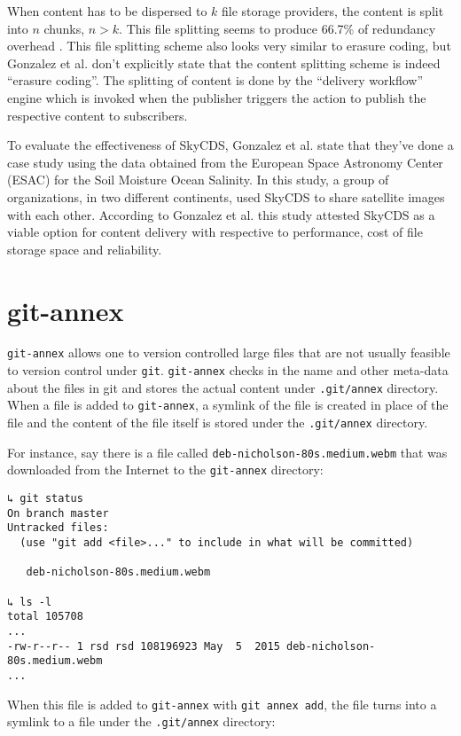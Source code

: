 When content has to be dispersed to $k$ file storage providers, the
content is split into $n$ chunks, $n > k$. This file splitting seems
to produce 66.7\% of redundancy overhead \cite{skycds}. This file
splitting scheme also looks very similar to erasure coding, but
Gonzalez et al. don't explicitly state that the content splitting
scheme is indeed ``erasure coding''. The splitting of content is done
by the ``delivery workflow'' engine which is invoked when the
publisher triggers the action to publish the respective content to
subscribers.

To evaluate the effectiveness of SkyCDS, Gonzalez et al. state that
they've done a case study using the data obtained from the European
Space Astronomy Center (ESAC) for the Soil Moisture Ocean Salinity. In
this study, a group of organizations, in two different continents,
used SkyCDS to share satellite images with each other. According to
Gonzalez et al. this study attested SkyCDS as a viable option for
content delivery with respective to performance, cost of file storage
space and reliability.

\section{git-annex}\label{2-gitannex-sec}

\verb+git-annex+ allows one to version controlled large files that are
not usually feasible to version control under
\verb+git+\cite{program:git}. \verb+git-annex+ checks in the name and
other meta-data about the files in git and stores the actual content
under \verb+.git/annex+ directory. When a file is added to
\verb+git-annex+, a symlink of the file is created in place of the
file and the content of the file itself is stored under the
\verb+.git/annex+ directory.

For instance, say there is a file called
\verb+deb-nicholson-80s.medium.webm+ that was downloaded from the
Internet to the \verb+git-annex+ directory:

\begin{verbatim}
↳ git status
On branch master
Untracked files:
  (use "git add <file>..." to include in what will be committed)

   deb-nicholson-80s.medium.webm

↳ ls -l
total 105708
...
-rw-r--r-- 1 rsd rsd 108196923 May  5  2015 deb-nicholson-80s.medium.webm
...
\end{verbatim}

When this file is added to \verb+git-annex+ with \verb+git annex add+,
the file turns into a symlink to a file under the \verb+.git/annex+
directory:

